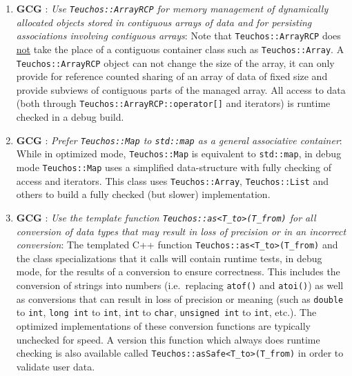 \begin{enumerate}
{}\item{}\textbf{GCG }:
{}\textit{Use {}\texttt{Teuchos::ArrayRCP} for memory management of
dynamically allocated objects stored in contiguous arrays of data and for
persisting associations involving contiguous arrays}: Note that
{}\texttt{Teuchos::ArrayRCP} does {}\underline{not} take the place of a
contiguous container class such as {}\texttt{Teuchos::\-Array}.  A
{}\texttt{Teuchos::ArrayRCP} object can not change the size of the array, it
can only provide for reference counted sharing of an array of data of fixed
size and provide subviews of contiguous parts of the managed array.  All
access to data (both through {}\texttt{Teuchos::\-ArrayRCP::\-operator[]} and
iterators) is runtime checked in a debug build.

{}\item{}\textbf{GCG }:
{}\textit{Prefer {}\texttt{Teuchos::Map} to {}\texttt{std::map} as a general
associative container}: While in optimized mode, {}\texttt{Teuchos\-::Map} is
equivalent to {}\texttt{std\-::map}, in debug mode {}\texttt{Teuchos\-::Map}
uses a simplified data-structure with fully checking of access and iterators.
This class uses {}\texttt{Teuchos\-::Array}, {}\texttt{Teuchos::List} and
others to build a fully checked (but slower) implementation.

{}\item{}\textbf{GCG }:
{}\textit{Use the template function {}\texttt{Teuchos::as<T\_to>(T\_from)} for
all conversion of data types that may result in loss of precision or in an
incorrect conversion}: The templated C++ function
{}\texttt{Teuchos::as<T\_to>(T\_from)} and the class specializations that it
calls will contain runtime tests, in debug mode, for the results of a
conversion to ensure correctness.  This includes the conversion of strings
into numbers (i.e.\ replacing {}\texttt{atof()} and {}\texttt{atoi()}) as well
as conversions that can result in loss of precision or meaning (such as
{}\texttt{double} to {}\texttt{int}, {}\texttt{long int} to {}\texttt{int},
{}\texttt{int} to {}\texttt{char}, {}\texttt{unsigned int} to {}\texttt{int},
etc.).  The optimized implementations of these conversion functions are
typically unchecked for speed.  A version this function which always does
runtime checking is also available called
{}\texttt{Teuchos\-::asSafe\-<\-T\_to\->\-(\-T\_from\-)} in order to validate
user data.


\end{enumerate}
